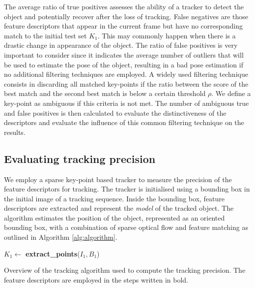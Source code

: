 The average ratio of true positives assesses the ability of a tracker to detect the object and potentially recover after the loss of tracking. False negatives are those feature descriptors that appear in the current frame but have no corresponding match to the initial test set $K_{1}$. This may commonly happen when there is a drastic change in appearance of the object. The ratio of false positives is very important to consider since it indicates the average number of outliers that will be used to estimate the pose of the object, resulting in a bad pose estimation if no additional filtering techniques are employed. A widely used filtering technique consists in discarding all matched key-points if the ratio between the score of the best match and the second best match is below a certain threshold $\rho$. We define a key-point as ambiguous if this criteria is not met. The  number of ambiguous true and false positives is then calculated to evaluate the distinctiveness of the descriptors and evaluate the influence of this common filtering technique on the results.

\subsection{Evaluating tracking precision}
\label{sec:accuracy}

We employ a sparse key-point based tracker to measure the precision of the feature descriptors for tracking. The tracker is initialised using a bounding box in the initial image of a tracking sequence. Inside the bounding box, feature descriptors are extracted and represent the \textit{model} of the tracked object. The algorithm estimates the position of the object, represented as an oriented bounding box, with a combination of sparse optical flow and feature matching as outlined in Algorithm \ref{alg:algorithm}. 

\begin{algorithm}[!htb]
 $K_{1} \gets$ \textbf{extract\_points}($I_{1},B_1$)\;
 \caption{\label{alg:algorithm}Overview of the tracking algorithm used to compute the tracking precision. The feature descriptors are employed in the steps written in bold. }
\end{algorithm}

